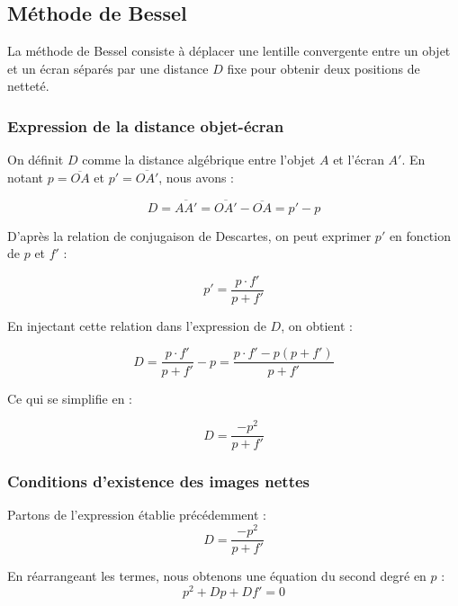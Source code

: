 \subsection{Méthode de Bessel}

La méthode de Bessel consiste à déplacer une lentille convergente 
entre un objet et un écran séparés par une distance $D$ fixe 
pour obtenir deux positions de netteté.

\subsubsection{Expression de la distance objet-écran}

On définit $D$ comme la distance algébrique entre l'objet $A$ et l'écran $A'$. 
En notant $p = \overline{OA}$ et $p' = \overline{OA'}$, 
nous avons :

\begin{equation}
    D = \overline{AA'} = \overline{OA'} - \overline{OA} = p' - p
\end{equation}

D'après la relation de conjugaison de Descartes, 
on peut exprimer $p'$ en fonction de $p$ et $f'$ :

\begin{equation}
    p' = \frac{p \cdot f'}{p + f'}
\end{equation}

En injectant cette relation dans l'expression de $D$, 
on obtient :

\begin{equation}
    D = \frac{p \cdot f'}{p + f'} - p = \frac{p \cdot f' - p(p + f')}{p + f'}
\end{equation}

Ce qui se simplifie en :

\begin{equation}
    D = \frac{-p^{2}}{p + f'}
\end{equation}

\subsubsection{Conditions d'existence des images nettes}

Partons de l'expression établie précédemment :
\begin{equation}
    D = \frac{-p^{2}}{p + f'}
\end{equation}

En réarrangeant les termes, 
nous obtenons une équation du second degré en $p$ :
\begin{equation}
    p^{2} + Dp + Df' = 0
\end{equation}

